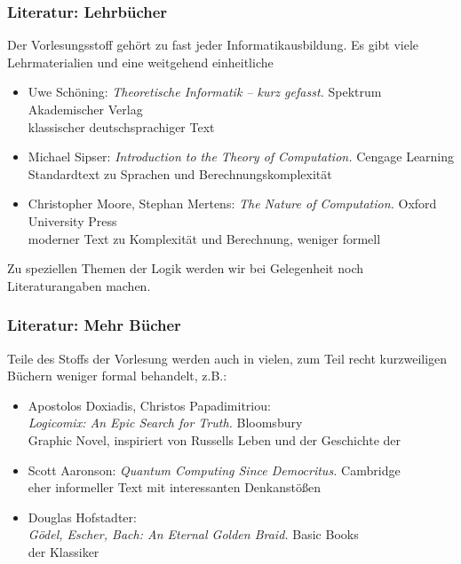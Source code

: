 \documentclass[aspectratio=1610,onlymath]{beamer}
\begin{document}
\begin{frame}\frametitle{Literatur: Lehrbücher}

Der Vorlesungsstoff gehört zu fast jeder Informatikausbildung. Es gibt viele
Lehrmaterialien und eine weitgehend einheitliche 
\bigskip

\begin{itemize}
\item Uwe Schöning: \emph{Theoretische Informatik -- kurz gefasst.} Spektrum Akademischer Verlag\\
{\footnotesize\textcolor{devilscss}{klassischer deutschsprachiger Text}}
%
\item Michael Sipser: \emph{Introduction to the Theory of Computation.}  Cengage Learning\\
{\footnotesize\textcolor{devilscss}{Standardtext zu Sprachen und Berechnungskomplexität}}
%
\item Christopher Moore, Stephan Mertens: \emph{The Nature of Computation.} Oxford University Press\\
{\footnotesize\textcolor{devilscss}{moderner Text zu Komplexität und Berechnung, weniger formell}}
\end{itemize}

Zu speziellen Themen der Logik werden wir bei Gelegenheit noch Literaturangaben machen.

\end{frame}

\begin{frame}\frametitle{Literatur: Mehr Bücher}

Teile des Stoffs der Vorlesung werden auch in vielen, zum Teil recht kurzweiligen
Büchern weniger formal behandelt, z.B.:
\bigskip

\begin{itemize}
\item Apostolos Doxiadis, Christos Papadimitriou:\\ \emph{Logicomix: An Epic Search for Truth.} Bloomsbury\\
{\footnotesize\textcolor{devilscss}{Graphic Novel, inspiriert von Russells Leben und der Geschichte der }}
%
\item Scott Aaronson: \emph{Quantum Computing Since Democritus.} Cambridge\\
{\footnotesize\textcolor{devilscss}{eher informeller Text mit interessanten Denkanstößen}}
%
\item Douglas Hofstadter:\\ \emph{Gödel, Escher, Bach: An Eternal Golden Braid.} Basic Books\\
{\footnotesize\textcolor{devilscss}{der Klassiker}}
\end{itemize}

\end{frame}
\end{document}
